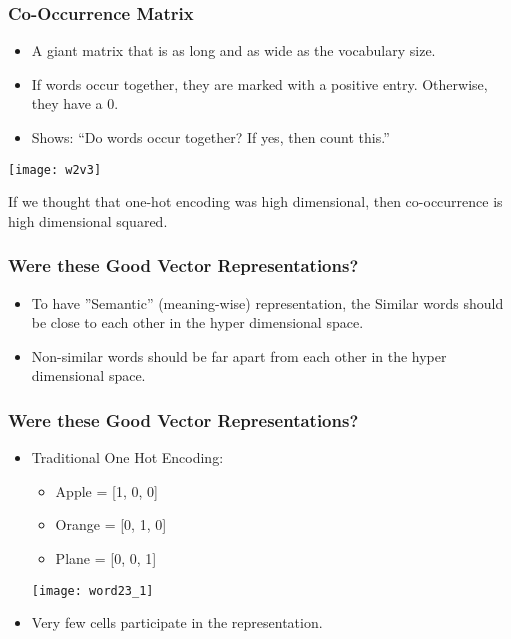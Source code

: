 \begin{frame}[fragile]\frametitle{Co-Occurrence Matrix}
  \begin{itemize}
    \item  A giant matrix that is as long and as wide as the vocabulary size. 
	\item If words occur together, they are marked with a positive entry. Otherwise, they have a 0. 
	\item Shows: ``Do words occur together? If yes, then count this.''
  \end{itemize}
  
\begin{center}
\texttt{[image: w2v3]}
\end{center}

If we thought that one-hot encoding was high dimensional, then co-occurrence is high dimensional squared.
\end{frame}



\begin{frame}[fragile]\frametitle{Were these Good Vector Representations?}
\begin{itemize}
\item To have ''Semantic'' (meaning-wise) representation, the Similar words should be close to each other in the hyper dimensional space.
\item Non-similar words should be far apart from each other in the hyper dimensional space.
\end{itemize}
\end{frame}

\begin{frame}[fragile]\frametitle{Were these Good Vector Representations?}
\begin{itemize}
\item Traditional One Hot Encoding:
	\begin{itemize}
	\item Apple = [1, 0, 0]
	\item Orange = [0, 1, 0]
	\item Plane = [0, 0, 1]
	\end{itemize}
\begin{center}
\texttt{[image: word23\_1]}
\end{center}
\item Very few cells participate in the representation.
\end{itemize}
\end{frame}

